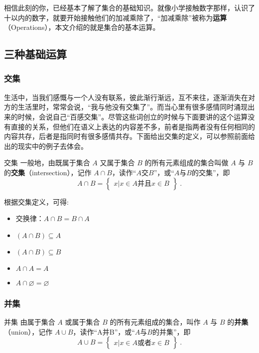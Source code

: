
\begin{issues}
\issueDraft
\end{issues}
相信此刻的你，已经基本了解了集合的基础知识。就像小学接触数字那样，认识了十以内的数字，就要开始接触他们的加减乘除了，“加减乘除”被称为\textbf{运算}（Operations），本文介绍的就是集合的基本运算。

\subsection{三种基础运算}

\subsubsection{交集}

生活中，当我们感慨与一个人没有联系，彼此渐行渐远，互不来往，逐渐消失在对方的生活里时，常常会说，“我与他没有交集了”。而当心里有很多感情同时涌现出来的时候，会说自己“百感交集”。尽管这些词创立的时候与下面要讲的这个运算没有直接的关系，但他们在语义上表达的内容差不多，前者是指两者没有任何相同的内容共存，后者是指同时有很多感情共存。下面给出交集的定义，可以参照前面给出的现实中的例子去体会。

\begin{definition}{交集}
一般地，由既属于集合 $A$ 又属于集合 $B$ 的所有元素组成的集合叫做 $A$ 与 $B$ 的\textbf{交集}（intersection），记作 $A \cap B$，读作“$A$交$B$”，或“$A$与$B$的交集”，即
\begin{equation}
A\cap B = \begin{Bmatrix} x|x\in A\text{并且} x\in B \end{Bmatrix}~.
\end{equation}
\end{definition}

根据交集定义，可得:
\begin{itemize}
\item 交换律：$A\cap B = B\cap A$
\item $(A\cap B) \subseteq A$
\item $(A\cap B) \subseteq B$
\item $A\cap A = A$
\item $A\cap \varnothing = \varnothing$
\end{itemize}


\subsubsection{并集}
\begin{definition}{并集}
由属于集合 $A$ 或属于集合 $B$ 的所有元素组成的集合，叫作 $A$ 与 $B$ 的\textbf{并集}（union），记作 $A\cup B$，读作“A并B”，或“$A$与$B$的并集”，即
\begin{equation}
A\cup B = \begin{Bmatrix}x|x\in A \text{或者} x\in B\end{Bmatrix}~.
\end{equation}
\end{definition}

